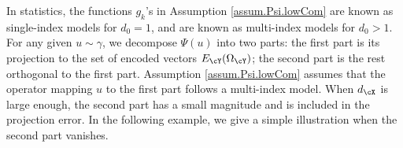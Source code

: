 \documentclass[11pt]{article} %
\begin{document}

In statistics, the functions $g_k$'s in Assumption \ref{assum.Psi.lowCom} are known as single-index models for $d_0=1$, and are known as multi-index models for $d_0>1$. 
For any given $u\sim \gamma$, we decompose $\Psi(u)$ into two parts: the first part is its projection to the set of encoded vectors $E_{\cY}(\Omega_{\cY})$; the second part is the rest orthogonal to the first part. Assumption \ref{assum.Psi.lowCom} assumes that the operator mapping $u$ to the first part follows a multi-index model. When $d_{\cX}$ is large enough, the second part has a small magnitude and is included in the projection error.
In the following example, we give a simple illustration when the second part vanishes.
\end{document}
